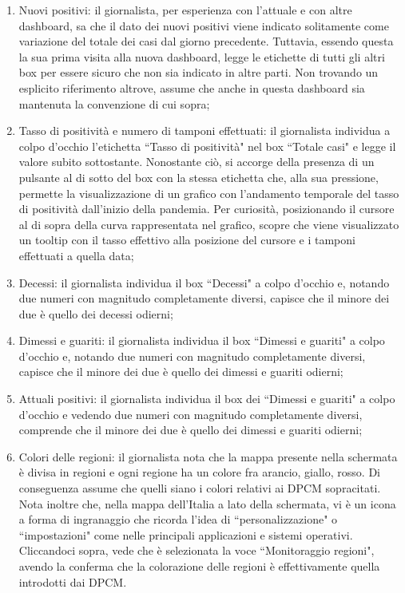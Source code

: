 \begin{enumerate}[label=\alph*.]
    \item Nuovi positivi: il giornalista, per esperienza con l'attuale e con altre dashboard, sa che il dato dei nuovi positivi viene indicato solitamente come variazione del totale dei casi dal giorno precedente. Tuttavia, essendo questa la sua prima visita alla nuova dashboard, legge le etichette di tutti gli altri box per essere sicuro che non sia indicato in altre parti. Non trovando un esplicito riferimento altrove, assume che anche in questa dashboard sia mantenuta la convenzione di cui sopra;
    \item Tasso di positività e numero di tamponi effettuati: il giornalista individua a colpo d'occhio l'etichetta ``Tasso di positività" nel box ``Totale casi" e legge il valore subito sottostante. Nonostante ciò, si accorge della presenza di un pulsante al di sotto del box con la stessa etichetta che, alla sua pressione, permette la visualizzazione di un grafico con l'andamento temporale del tasso di positività dall'inizio della pandemia. Per curiosità, posizionando il cursore al di sopra della curva rappresentata nel grafico, scopre che viene visualizzato un tooltip con il tasso effettivo alla posizione del cursore e i tamponi effettuati a quella data;
    \item Decessi: il giornalista individua il box ``Decessi" a colpo d'occhio e, notando due numeri con magnitudo completamente diversi, capisce che il minore dei due è quello dei decessi odierni;
    \item Dimessi e guariti: il giornalista individua il box ``Dimessi e guariti" a colpo d'occhio e, notando due numeri con magnitudo completamente diversi, capisce che il minore dei due è quello dei dimessi e guariti odierni;
    \item Attuali positivi: il giornalista individua il box dei ``Dimessi e guariti" a colpo d'occhio e vedendo due numeri con magnitudo completamente diversi, comprende che il minore dei due è quello dei dimessi e guariti odierni;
    \item Colori delle regioni: il giornalista nota che la mappa presente nella schermata è divisa in regioni e ogni regione ha un colore fra arancio, giallo, rosso. Di conseguenza assume che quelli siano i colori relativi ai DPCM sopracitati. Nota inoltre che, nella mappa dell'Italia a lato della schermata, vi è un icona a forma di ingranaggio che ricorda l'idea di ``personalizzazione" o ``impostazioni" come nelle principali applicazioni e sistemi operativi. Cliccandoci sopra, vede che è selezionata la voce ``Monitoraggio regioni", avendo la conferma che la colorazione delle regioni è effettivamente quella introdotti dai DPCM. \label{cw1:f}
\end{enumerate}
